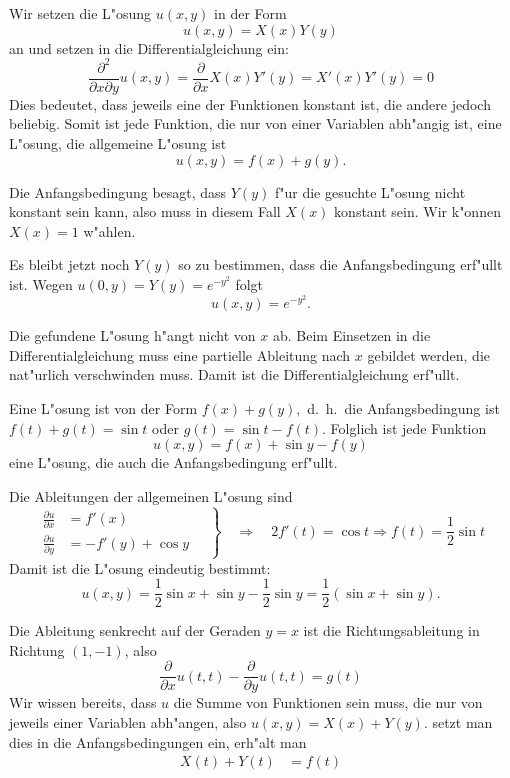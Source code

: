 \begin{loesung}
\begin{teilaufgaben}
\item
Wir setzen die L"osung $u(x,y)$ in der Form
\[
u(x,y)=X(x)Y(y)
\]
an und setzen in die Differentialgleichung ein:
\[
\frac{\partial^2}{\partial x\partial y}u(x,y)
=
\frac{\partial}{\partial x}X(x)Y'(y)
=
X'(x)Y'(y)=0
\]
Dies bedeutet, dass jeweils eine der Funktionen
konstant ist, die andere jedoch beliebig.
Somit ist jede Funktion, die nur von einer Variablen
abh"angig ist, eine L"osung, die allgemeine L"osung
ist
\[
u(x,y)=f(x)+g(y).
\]
\item
Die Anfangsbedingung besagt, dass $Y(y)$ f"ur die gesuchte
L"osung nicht konstant sein kann, also muss in diesem Fall
$X(x)$ konstant sein. Wir k"onnen $X(x)=1$ w"ahlen.

Es bleibt jetzt noch $Y(y)$ so zu bestimmen, dass die Anfangsbedingung
erf"ullt ist. Wegen $u(0,y)=Y(y)=e^{-y^2}$ folgt
\[
u(x,y)=e^{-y^2}.
\]
\item
Die gefundene L"osung h"angt nicht von $x$ ab. Beim Einsetzen
in die Differentialgleichung muss eine partielle Ableitung nach
$x$ gebildet werden, die nat"urlich verschwinden muss. Damit ist
die Differentialgleichung erf"ullt.
\item
Eine L"osung ist von der Form
$f(x)+g(y),$
d.~h.~die Anfangsbedingung ist $f(t)+g(t)=\sin t$ oder $g(t)=\sin t-f(t)$.
Folglich ist jede Funktion
\[
u(x,y)=f(x)+\sin y-f(y)
\]
eine L"osung, die auch die Anfangsbedingung erf"ullt.
\item
Die Ableitungen der allgemeinen L"osung sind
\[
\left.
\begin{aligned}
\frac{\partial u}{\partial x}
&=
f'(x)
\\
\frac{\partial u}{\partial y}
&=
-f'(y)+\cos y
\end{aligned}
\quad
\right\}
\quad
\Rightarrow
\quad
2f'(t)=\cos t
\Rightarrow f(t)=\frac12\sin t
\]
Damit ist die L"osung eindeutig bestimmt:
\[
u(x,y)=\frac12\sin x+\sin y-\frac12\sin y=\frac12(\sin x+\sin y).
\]
\item
Die Ableitung senkrecht auf der Geraden $y=x$ ist die Richtungsableitung
in Richtung $(1,-1)$, also
\[
\frac{\partial}{\partial x}u(t,t)-\frac{\partial}{\partial y}u(t,t)=g(t)
\]
Wir wissen bereits, dass $u$ die Summe von Funktionen sein muss, die
nur von jeweils einer Variablen abh"angen, also
$u(x,y)=X(x)+Y(y)$. setzt man dies in die Anfangsbedingungen
ein, erh"alt man
\begin{align*}
X(t)+Y(t)&=f(t)\\

\end{align*}
\end{teilaufgaben}
\end{loesung}
